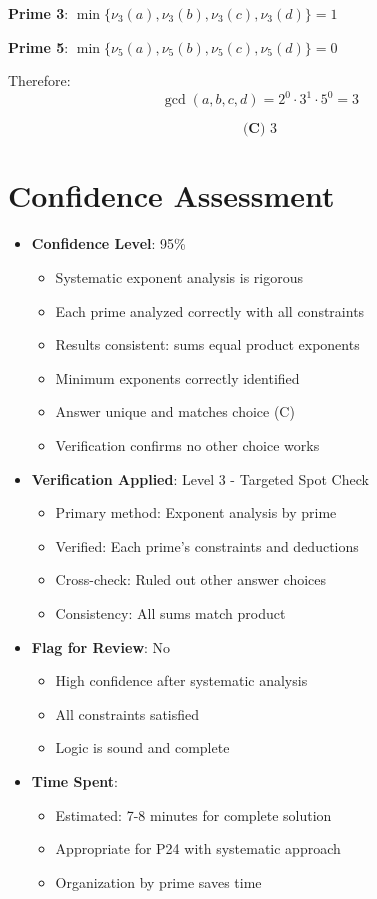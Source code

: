 \documentclass[12pt]{article}
\begin{document}
\textbf{Prime 3}: $\min\{\nu_3(a), \nu_3(b), \nu_3(c), \nu_3(d)\} = 1$

\textbf{Prime 5}: $\min\{\nu_5(a), \nu_5(b), \nu_5(c), \nu_5(d)\} = 0$

Therefore:
$$\gcd(a,b,c,d) = 2^0 \cdot 3^1 \cdot 5^0 = 3$$

$$\boxed{\textbf{(C) } 3}$$

\section*{Confidence Assessment}
\begin{itemize}[leftmargin=*]
    \item \textbf{Confidence Level}: 95\% 
    \begin{itemize}
        \item Systematic exponent analysis is rigorous
        \item Each prime analyzed correctly with all constraints
        \item Results consistent: sums equal product exponents
        \item Minimum exponents correctly identified
        \item Answer unique and matches choice (C)
        \item Verification confirms no other choice works
    \end{itemize}
    \item \textbf{Verification Applied}: Level 3 - Targeted Spot Check
    \begin{itemize}
        \item Primary method: Exponent analysis by prime
        \item Verified: Each prime's constraints and deductions
        \item Cross-check: Ruled out other answer choices
        \item Consistency: All sums match product
    \end{itemize}
    \item \textbf{Flag for Review}: No
    \begin{itemize}
        \item High confidence after systematic analysis
        \item All constraints satisfied
        \item Logic is sound and complete
    \end{itemize}
    \item \textbf{Time Spent}: 
    \begin{itemize}
        \item Estimated: 7-8 minutes for complete solution
        \item Appropriate for P24 with systematic approach
        \item Organization by prime saves time
    \end{itemize}
\end{itemize}
\end{document}

